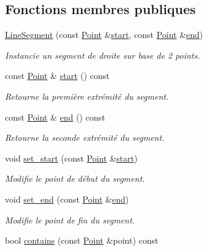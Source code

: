 \subsection*{Fonctions membres publiques}
\begin{DoxyCompactItemize}
\item 
\hyperlink{classLineSegment_a3873183b7bae15250c6d616247cd099b}{Line\+Segment} (const \hyperlink{classPoint}{Point} \&\hyperlink{classLineSegment_af9a830ffa92f1b2e8c6138e023efbf1e}{start}, const \hyperlink{classPoint}{Point} \&\hyperlink{classLineSegment_a0852438c18570f230b6c6be1571b9460}{end})
\begin{DoxyCompactList}\small\item\em Instancie un segment de droite sur base de 2 points. \end{DoxyCompactList}\item 
const \hyperlink{classPoint}{Point} \& \hyperlink{classLineSegment_af9a830ffa92f1b2e8c6138e023efbf1e}{start} () const 
\begin{DoxyCompactList}\small\item\em Retourne la première extrémité du segment. \end{DoxyCompactList}\item 
const \hyperlink{classPoint}{Point} \& \hyperlink{classLineSegment_a0852438c18570f230b6c6be1571b9460}{end} () const 
\begin{DoxyCompactList}\small\item\em Retourne la seconde extrémité du segment. \end{DoxyCompactList}\item 
void \hyperlink{classLineSegment_adb965beb1d587a3aa16714bcf0d1dbad}{set\+\_\+start} (const \hyperlink{classPoint}{Point} \&\hyperlink{classLineSegment_af9a830ffa92f1b2e8c6138e023efbf1e}{start})
\begin{DoxyCompactList}\small\item\em Modifie le point de début du segment. \end{DoxyCompactList}\item 
void \hyperlink{classLineSegment_a8c001c5c898d912a9c6ecaba79a2cca3}{set\+\_\+end} (const \hyperlink{classPoint}{Point} \&\hyperlink{classLineSegment_a0852438c18570f230b6c6be1571b9460}{end})
\begin{DoxyCompactList}\small\item\em Modifie le point de fin du segment. \end{DoxyCompactList}\item 
bool \hyperlink{classLineSegment_a372c33eaea8eabc2e0a3e4f909f986dd}{contains} (const \hyperlink{classPoint}{Point} \&point) const 

\end{DoxyCompactItemize}
